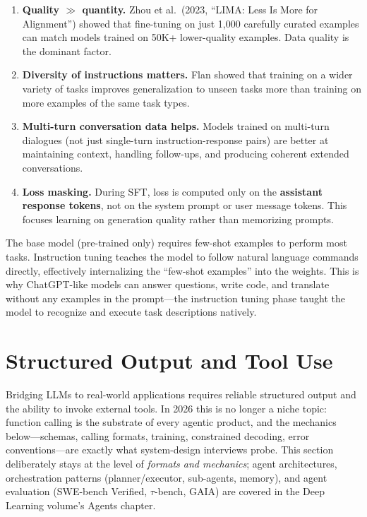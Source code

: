 \begin{enumerate}[leftmargin=*]
\item \textbf{Quality $\gg$ quantity.}  Zhou et al.\ (2023, ``LIMA: Less Is
  More for Alignment'') showed that fine-tuning on just 1,000 carefully
  curated examples can match models trained on 50K+ lower-quality examples.
  Data quality is the dominant factor.

\item \textbf{Diversity of instructions matters.}  Flan showed that training
  on a wider variety of tasks improves generalization to unseen tasks more
  than training on more examples of the same task types.

\item \textbf{Multi-turn conversation data helps.}  Models trained on
  multi-turn dialogues (not just single-turn instruction-response pairs)
  are better at maintaining context, handling follow-ups, and producing
  coherent extended conversations.

\item \textbf{Loss masking.}  During SFT, loss is computed only on the
  \textbf{assistant response tokens}, not on the system prompt or user
  message tokens.  This focuses learning on generation quality rather than
  memorizing prompts.
\end{enumerate}

\begin{keyinsight}
The base model (pre-trained only) requires few-shot examples to perform most
tasks.  Instruction tuning teaches the model to follow natural language
commands directly, effectively internalizing the ``few-shot examples'' into
the weights.  This is why ChatGPT-like models can answer questions, write
code, and translate without any examples in the prompt---the instruction
tuning phase taught the model to recognize and execute task descriptions
natively.
\end{keyinsight}


\section{Structured Output and Tool Use}
\label{sec:tool_use}

Bridging LLMs to real-world applications requires reliable structured output
and the ability to invoke external tools.  In 2026 this is no longer a niche
topic: function calling is the substrate of every agentic product, and the
mechanics below---schemas, calling formats, training, constrained decoding,
error conventions---are exactly what system-design interviews probe.  This
section deliberately stays at the level of \emph{formats and mechanics};
agent architectures, orchestration patterns (planner/executor, sub-agents,
memory), and agent evaluation (SWE-bench Verified, $\tau$-bench, GAIA) are
covered in the Deep Learning volume's Agents chapter.

